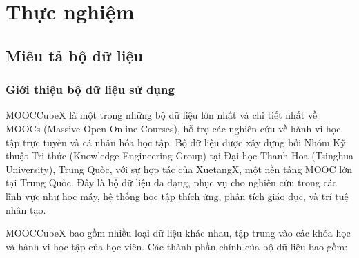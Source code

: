 \section{Thực nghiệm}
\subsection{Miêu tả bộ dữ liệu}
\subsubsection{Giới thiệu bộ dữ liệu sử dụng}

MOOCCubeX là một trong những bộ dữ liệu lớn nhất và chi tiết nhất về MOOCs (Massive Open Online Courses), hỗ trợ các nghiên cứu về hành vi học tập trực tuyến và cá nhân hóa học tập. Bộ dữ liệu được xây dựng bởi Nhóm Kỹ thuật Tri thức (Knowledge Engineering Group) tại Đại học Thanh Hoa (Tsinghua University), Trung Quốc, với sự hợp tác của XuetangX, một nền tảng MOOC lớn tại Trung Quốc. Đây là bộ dữ liệu đa dạng, phục vụ cho nghiên cứu trong các lĩnh vực như học máy, hệ thống học tập thích ứng, phân tích giáo dục, và trí tuệ nhân tạo.

MOOCCubeX bao gồm nhiều loại dữ liệu khác nhau, tập trung vào các khóa học và hành vi học tập của học viên. Các thành phần chính của bộ dữ liệu bao gồm:

